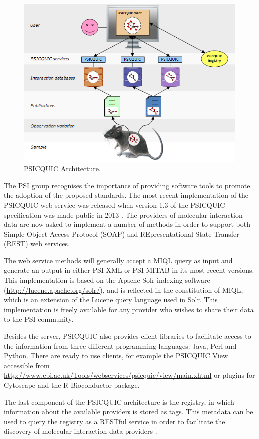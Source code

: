 \begin{figure}  
\centering
\includegraphics[width=4.5in]{figures/psicquic.png}
\caption[PSICQUIC Architecture.]{PSICQUIC Architecture.
\label{fig:psicquic}}
\end{figure}

The PSI group recognises the importance of providing software tools to promote the adoption of the proposed standards. The most recent implementation of the PSICQUIC web service was released when version 1.3 of the PSICQUIC specification was made public in 2013 \cite{DEL2013}. The providers of molecular interaction data are now asked to implement a number of methods in order to support both Simple Object Access Protocol (SOAP) and REpresentational State Transfer (REST) web services. 

The web service methods will generally accept a MIQL query as input and generate an output in either PSI-XML or PSI-MITAB in its most recent versions. This implementation is based on the Apache Solr indexing software (\url{http://lucene.apache.org/solr/}), and is reflected in the constitution of MIQL, which is an extension of the Lucene query language used in Solr. This implementation is freely available for any provider who wishes to share their data to the PSI community.

Besides the server, PSICQUIC also provides client libraries to facilitate access to the information from three different programming languages: Java, Perl and Python. There are ready to use clients, for example the PSICQUIC View accessible from \url{http://www.ebi.ac.uk/Tools/webservices/psicquic/view/main.xhtml} or plugins for Cytoscape and the R Bioconductor package.

The last component of the PSICQUIC architecture is the registry, in which information about the available providers is stored as tags. This metadata can be used to query the registry as a RESTful service in order to facilitate the discovery of molecular-interaction data providers \cite{DEL2013}.


